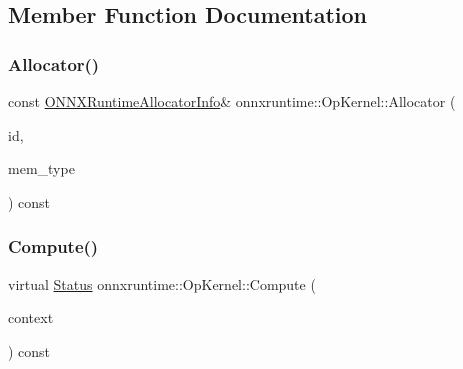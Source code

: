 \subsection{Member Function Documentation}
\mbox{\label{classonnxruntime_1_1OpKernel_afca209ed70939b916a5df7c0795391e2}} 
\subsubsection{\texorpdfstring{Allocator()}{Allocator()}}
{\footnotesize\ttfamily const \mbox{\hyperlink{structONNXRuntimeAllocatorInfo}{O\+N\+N\+X\+Runtime\+Allocator\+Info}}\& onnxruntime\+::\+Op\+Kernel\+::\+Allocator (\begin{DoxyParamCaption}\item[{int}]{id,  }\item[{\mbox{\hyperlink{allocator__info_8h_add3f8ee3ff93395704abae71c30cab18}{O\+N\+N\+X\+Runtime\+Mem\+Type}}}]{mem\+\_\+type }\end{DoxyParamCaption}) const\hspace{0.3cm}{\ttfamily [inline]}}

\mbox{\label{classonnxruntime_1_1OpKernel_a9eca8656a78b1b3ab9d3351a12798650}} 
\subsubsection{\texorpdfstring{Compute()}{Compute()}}
{\footnotesize\ttfamily virtual \mbox{\hyperlink{classonnxruntime_1_1common_1_1Status}{Status}} onnxruntime\+::\+Op\+Kernel\+::\+Compute (\begin{DoxyParamCaption}\item[{\mbox{\hyperlink{classonnxruntime_1_1OpKernelContext}{Op\+Kernel\+Context}} $\ast$}]{context }\end{DoxyParamCaption}) const\hspace{0.3cm}{\ttfamily [pure virtual]}}



